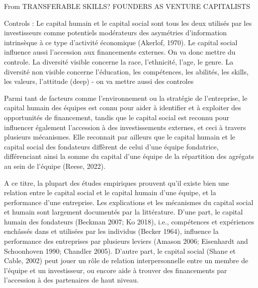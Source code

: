\documentclass[11pt]{article}
\begin{document}
From TRANSFERABLE SKILLS? FOUNDERS AS VENTURE CAPITALISTS

Controls : Le capital humain et le capital social sont tous les deux utilisés par les investisseurs comme potentiels modérateurs des asymétries d'information intrinsèque à ce type d'activité économique (Akerlof, 1970). Le capital social influence aussi l'accession aux financements externes. On va donc mettre du controle. La diversité visible concerne la race, l'ethnicité, l'age, le genre. La diversité non visible concerne l'éducation, les compétences, les abilités, les skills, les valeurs, l'attitude (deep) - on va mettre aussi des controles

Parmi tant de facteurs comme l'environnement ou la stratégie de l'entreprise, le capital humain des équipes est connu pour aider à identifier et à exploiter des opportunités de financement, tandis que le capital social est reconnu pour influencer également l'accession à des investissements externes, et ceci à travers plusieurs mécanismes. Elle reconnait par ailleurs que le capital humain et le capital social des fondateurs diffèrent de celui d'une équipe fondatrice, différenciant ainsi la somme du capital d'une équipe de la répartition des agrégats au sein de l'équipe (Reese, 2022).

A ce titre, la plupart des études empiriques prouvent qu'il existe bien une relation entre le capital social et le capital humain d'une équipe, et la performance d'une entreprise. Les explications et les mécanismes du capital social et humain sont largement documentés par la littérature. D'une part, le capital humain des fondateurs (Beckman 2007; Ko 2018), i.e., compétences et expériences enchâssés dans et utilisées par les individus (Becker 1964), influence la performance des entreprises par plusieurs leviers (Amason 2006; Eisenhardt and Schoonhoven 1990; Chandler 2005). D'autre part, le capital social (Shane et Cable, 2002) peut jouer un rôle de relation interpersonnelle entre un membre de l'équipe et un investisseur, ou encore aide à trouver des financements par l'accession à des partenaires de haut niveau.
\end{document}
